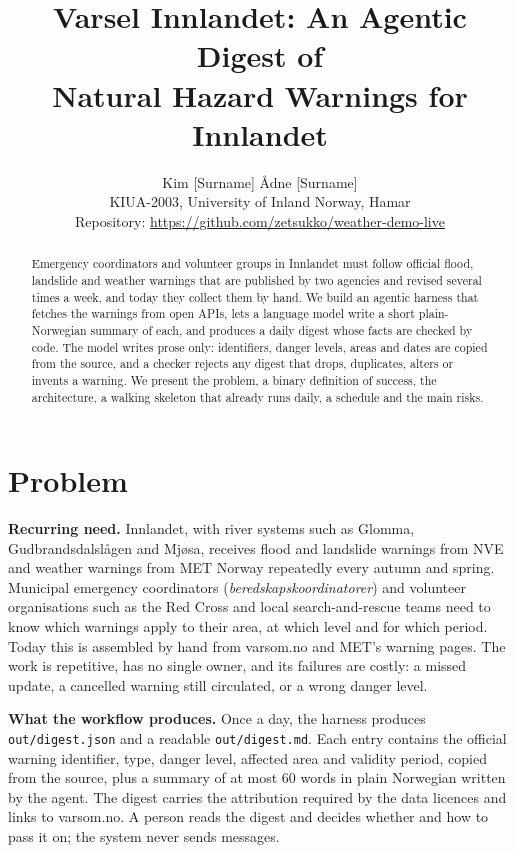 \documentclass{article}
\title{Varsel Innlandet: An Agentic Digest of\\Natural Hazard Warnings for Innlandet}
\author{%
  Kim [Surname] \qquad Ådne [Surname] \\
  KIUA-2003, University of Inland Norway, Hamar \\
  Repository: \url{https://github.com/zetsukko/weather-demo-live}
}
\newcommand{\code}[1]{\texttt{#1}}
\begin{document}
\maketitle

\begin{abstract}
Emergency coordinators and volunteer groups in Innlandet must follow official flood, landslide and weather warnings that are published by two agencies and revised several times a week, and today they collect them by hand. We build an agentic harness that fetches the warnings from open APIs, lets a language model write a short plain-Norwegian summary of each, and produces a daily digest whose facts are checked by code. The model writes prose only: identifiers, danger levels, areas and dates are copied from the source, and a checker rejects any digest that drops, duplicates, alters or invents a warning. We present the problem, a binary definition of success, the architecture, a walking skeleton that already runs daily, a schedule and the main risks.
\end{abstract}

\section{Problem}

\textbf{Recurring need.} Innlandet, with river systems such as Glomma, Gudbrandsdalslågen and Mjøsa, receives flood and landslide warnings from NVE and weather warnings from MET Norway repeatedly every autumn and spring. Municipal emergency coordinators (\emph{beredskapskoordinatorer}) and volunteer organisations such as the Red Cross and local search-and-rescue teams need to know which warnings apply to their area, at which level and for which period. Today this is assembled by hand from varsom.no and MET's warning pages. The work is repetitive, has no single owner, and its failures are costly: a missed update, a cancelled warning still circulated, or a wrong danger level.

\textbf{What the workflow produces.} Once a day, the harness produces \code{out/digest.json} and a readable \code{out/digest.md}. Each entry contains the official warning identifier, type, danger level, affected area and validity period, copied from the source, plus a summary of at most 60 words in plain Norwegian written by the agent. The digest carries the attribution required by the data licences and links to varsom.no. A person reads the digest and decides whether and how to pass it on; the system never sends messages.
\end{document}
